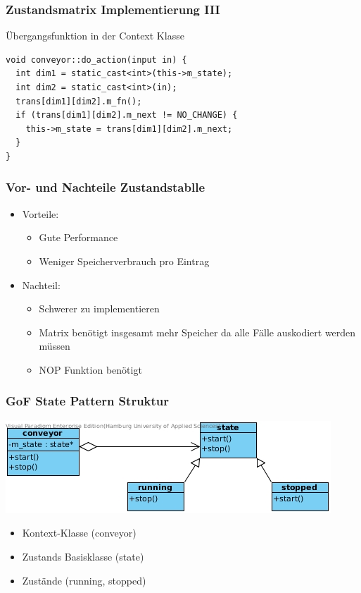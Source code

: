 \documentclass{beamer}
\begin{document}
\begin{frame}[fragile]
 \frametitle{Zustandsmatrix Implementierung III}
 \"Ubergangsfunktion in der Context Klasse
 \begin{lstlisting}
void conveyor::do_action(input in) {
  int dim1 = static_cast<int>(this->m_state);
  int dim2 = static_cast<int>(in);
  trans[dim1][dim2].m_fn();
  if (trans[dim1][dim2].m_next != NO_CHANGE) {
    this->m_state = trans[dim1][dim2].m_next;
  }
}
 \end{lstlisting}
\end{frame}

\begin{frame}
 \frametitle{Vor- und Nachteile Zustandstablle}
 \begin{itemize}
  \item Vorteile:
  \begin{itemize}
   \item Gute Performance
   \item Weniger Speicherverbrauch pro Eintrag
  \end{itemize}
  \item Nachteil:
  \begin{itemize}
   \item Schwerer zu implementieren
   \item Matrix ben\"otigt insgesamt mehr Speicher da alle F\"alle auskodiert werden m\"ussen
   \item NOP Funktion ben\"otigt
  \end{itemize}
 \end{itemize}
\end{frame}

\begin{frame}
 \frametitle{GoF State Pattern Struktur}
 \includegraphics[scale=.6]{img/fsm_gof.jpg}
 \begin{itemize}
  \item Kontext-Klasse (conveyor)
  \item Zustands Basisklasse (state)
  \item Zust\"ande (running, stopped)
 \end{itemize}
\end{frame}
\end{document}

